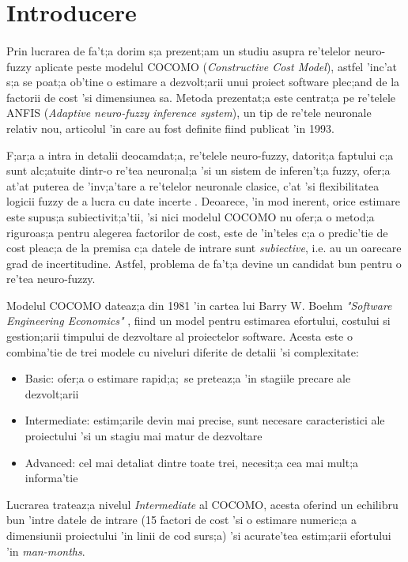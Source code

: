 \section{Introducere}

\paragraph{}

Prin lucrarea de fa't;a dorim s;a prezent;am un studiu asupra re'telelor neuro-fuzzy aplicate peste modelul COCOMO (\textit{Constructive Cost Model}), astfel 'inc'at s;a se poat;a ob'tine o estimare a dezvolt;arii unui proiect software plec;and de la factorii de cost 'si dimensiunea sa. Metoda prezentat;a este centrat;a pe re'telele ANFIS (\textit{Adaptive neuro-fuzzy inference system}), un tip de re'tele neuronale relativ nou, articolul 'in care au fost definite fiind publicat 'in 1993.

\par
F;ar;a a intra in detalii deocamdat;a, re'telele neuro-fuzzy, datorit;a faptului c;a sunt alc;atuite dintr-o re'tea neuronal;a 'si un sistem de inferen't;a fuzzy, ofer;a at'at puterea de 'inv;a'tare a re'telelor neuronale clasice, c'at 'si flexibilitatea logicii fuzzy de a lucra cu date incerte \cite{anfis}. Deoarece, 'in mod inerent, orice estimare este supus;a subiectivit;a'tii, 'si nici modelul COCOMO nu ofer;a o metod;a riguroas;a pentru alegerea factorilor de cost, este de 'in'teles c;a o predic'tie de cost pleac;a de la premisa c;a datele de intrare sunt \textit{subiective}, i.e. au un oarecare grad de incertitudine. Astfel, problema de fa't;a devine un candidat bun pentru o re'tea neuro-fuzzy. 

\par
Modelul COCOMO dateaz;a din 1981 'in cartea lui Barry W. Boehm \textit{"Software Engineering Economics"} \cite{boehm}, fiind un model pentru estimarea efortului, costului si gestion;arii timpului de dezvoltare al proiectelor software. Acesta este o combina'tie de trei modele cu niveluri diferite de detalii 'si complexitate:
\begin{itemize}
\item Basic: ofer;a o estimare rapid;a;\ se preteaz;a 'in stagiile precare ale dezvolt;arii
\item Intermediate: estim;arile devin mai precise, sunt necesare caracteristici ale proiectului 'si un stagiu mai matur de dezvoltare
\item Advanced: cel mai detaliat dintre toate trei, necesit;a cea mai mult;a informa'tie
\end{itemize}
Lucrarea trateaz;a nivelul \textit{Intermediate} al COCOMO, acesta oferind un echilibru bun 'intre datele de intrare (15 factori de cost 'si o estimare numeric;a a dimensiunii proiectului 'in linii de cod surs;a) 'si acurate'tea estim;arii efortului 'in \textit{man-months}. 

